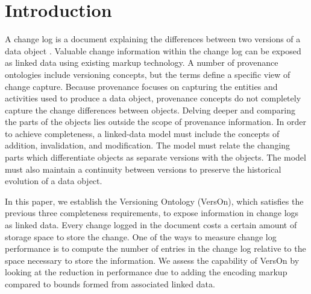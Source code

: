 

\maketitle

\section{Introduction}

A change log is a document explaining the differences between two versions of a data object \cite{uel1037}.
Valuable change information within the change log can be exposed as linked data using existing markup technology.
A number of provenance ontologies include versioning concepts, but the terms define a specific view of change capture.
Because provenance focuses on capturing the entities and activities used to produce a data object, provenance concepts do not completely capture the change differences between objects.
Delving deeper and comparing the parts of the objects lies outside the scope of provenance information.
In order to achieve completeness, a linked-data model must include the concepts of addition, invalidation, and modification.
The model must relate the changing parts which differentiate objects as separate versions with the objects.
The model must also maintain a continuity between versions to preserve the historical evolution of a data object.

In this paper, we establish the Versioning Ontology (VersOn), which satisfies the previous three completeness requirements, to expose information in change logs as linked data.
Every change logged in the document costs a certain amount of storage space to store the change.
One of the ways to measure change log performance is to compute the number of entries in the change log relative to the space necessary to store the information.
We assess the capability of VersOn by looking at the reduction in performance due to adding the encoding markup compared to bounds formed from associated linked data.
